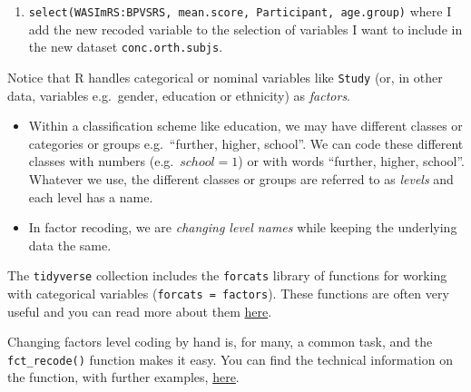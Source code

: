 \documentclass[
  letterpaper,
  DIV=11,
  numbers=noendperiod]{scrreprt}
\providecommand{\tightlist}{%
  \setlength{\itemsep}{0pt}\setlength{\parskip}{0pt}}\usepackage{longtable,booktabs,array}
\begin{document}
\begin{enumerate}
\def\labelenumi{\arabic{enumi}.}
\setcounter{enumi}{3}
\tightlist
\item
  \texttt{select(WASImRS:BPVSRS,\ mean.score,\ Participant,\ age.group)}
  where I add the new recoded variable to the selection of variables I
  want to include in the new dataset \texttt{conc.orth.subjs}.
\end{enumerate}

\begin{tcolorbox}[enhanced jigsaw, opacitybacktitle=0.6, title=\textcolor{quarto-callout-tip-color}{\faLightbulb}\hspace{0.5em}{Tip}, arc=.35mm, colbacktitle=quarto-callout-tip-color!10!white, colframe=quarto-callout-tip-color-frame, leftrule=.75mm, opacityback=0, breakable, titlerule=0mm, left=2mm, bottomrule=.15mm, toprule=.15mm, colback=white, coltitle=black, bottomtitle=1mm, toptitle=1mm, rightrule=.15mm]

Notice that R handles categorical or nominal variables like
\texttt{Study} (or, in other data, variables e.g.~gender, education or
ethnicity) as \emph{factors}.

\begin{itemize}
\tightlist
\item
  Within a classification scheme like education, we may have different
  classes or categories or groups e.g.~``further, higher, school''. We
  can code these different classes with numbers (e.g.~\(school = 1\)) or
  with words ``further, higher, school''. Whatever we use, the different
  classes or groups are referred to as \emph{levels} and each level has
  a name.
\item
  In factor recoding, we are \emph{changing level names} while keeping
  the underlying data the same.
\end{itemize}

\end{tcolorbox}

The \texttt{tidyverse} collection includes the \texttt{forcats} library
of functions for working with categorical variables
(\texttt{forcats\ =\ factors}). These functions are often very useful
and you can read more about them
\href{https://forcats.tidyverse.org}{here}.

Changing factors level coding by hand is, for many, a common task, and
the \texttt{fct\_recode()} function makes it easy. You can find the
technical information on the function, with further examples,
\href{https://forcats.tidyverse.org/reference/fct_recode.html}{here}.
\end{document}
